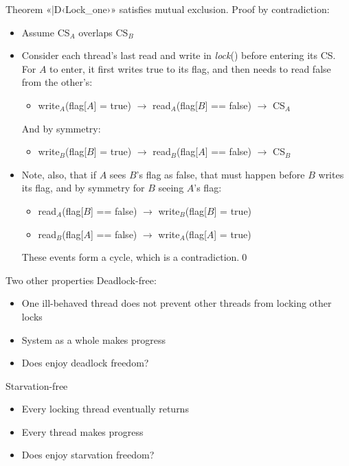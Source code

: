 \documentclass{beamer}
\begin{document}
\begin{frame}[fragile]{Theorem}{}
  «|D‹Lock_one›» satisfies mutual exclusion.
  \pause \alert{Proof by contradiction:}

  \begin{itemize}
    \item Assume CS$_A$ overlaps CS$_B$
    \pause
    \item Consider each thread’s last read and write in \emph{lock}() before
      entering its CS. For $A$ to enter, it first writes true to its flag,
      and then needs to read false from the other’s:
      \begin{itemize}
        \item write$_A$(flag[$A$] = true) $\to$ read$_A$(flag[$B$] == false) $\to$ CS$_A$
      \end{itemize}
      \pause
      And by symmetry:
      \begin{itemize}
        \item write$_B$(flag[$B$] = true) $\to$ read$_B$(flag[$A$] == false) $\to$ CS$_B$
      \end{itemize}
    \pause
    \item Note, also, that if $A$ sees $B$’s flag as false, that must happen
      before $B$ writes its flag, and by symmetry for $B$ seeing $A$’s flag:
      \begin{itemize}
        \item read$_A$(flag[$B$] == false) $\to$ write$_B$(flag[$B$] = true)
        \item read$_B$(flag[$A$] == false) $\to$ write$_A$(flag[$A$] = true)
      \end{itemize}
      \pause
      These events form a cycle, which is a contradiction.\hfill\qed
  \end{itemize}
\end{frame}

\begin{frame}{Two other properties}{}
  Deadlock-free:
  \begin{itemize}
    \item One ill-behaved thread does not prevent other threads from
      locking other locks
    \item System as a whole makes progress
    \item<2> Does  enjoy deadlock freedom?
  \end{itemize}
   Starvation-free
  \begin{itemize}
    \item Every locking thread eventually returns
    \item Every thread makes progress
    \item<2> Does  enjoy starvation freedom?
  \end{itemize}
\end{frame}
\end{document}
